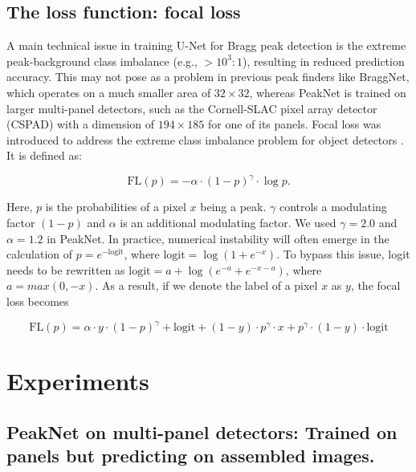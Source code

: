 \documentclass[conference]{IEEEtran}
\newcommand{\peaknet}{PeakNet}
\begin{document}
\subsection{The loss function: focal loss}

A main technical issue in training U-Net for Bragg peak detection is the extreme
peak-background class imbalance (e.g., $> 10^3 : 1$), resulting in reduced
prediction accuracy.  This may not pose as a problem in previous peak finders
like BraggNet, which operates on a much smaller area of $32 \times 32$, whereas
\peaknet{} is trained on larger multi-panel detectors, such as the Cornell-SLAC
pixel array detector (CSPAD) \citep{hartCornellSLACPixelArray2012} with a
dimension of $194 \times 185$ for one of its panels.  Focal loss was introduced
to address the extreme class imbalance problem for object detectors
\citep{linFocalLossDense2018}.  It is defined as:

\begin{equation}
    \text{FL}(p) = -\alpha \cdot (1-p)^\gamma \cdot \log{p}.
\end{equation}

Here, $p$ is the probabilities of a pixel $x$ being a peak.  $\gamma$ controls a
modulating factor $(1-p)$ and $\alpha$ is an additional modulating factor.  We
used $\gamma = 2.0$ and $\alpha = 1.2$ in \peaknet{}.  In practice, numerical
instability will often emerge in the calculation of $p = e^{-\text{logit}}$,
where $\text{logit} = \log{(1 + e^{-x})}$.  To bypass this issue, logit needs to
be rewritten as $\text{logit} = a + \log{(e^{-a} + e^{-x-a})}$, where $a = max(0,
-x)$.  As a result, if we denote the label of a pixel $x$ as $y$, the focal loss
becomes

\begin{equation}
    \text{FL}(p) = \alpha \cdot y \cdot (1-p)^\gamma + \text{logit} + (1 - y)
    \cdot p^\gamma \cdot x + p^\gamma \cdot (1 - y) \cdot \text{logit}
\end{equation}



\section{Experiments}

\subsection{\peaknet{} on multi-panel detectors: Trained on panels but
predicting on assembled images.}
\end{document}
